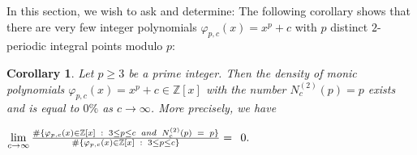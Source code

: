 \documentclass{article}
\theoremstyle{plain}
\newtheorem{cor}[thm]{Corollary}
\theoremstyle{definition}
\begin{document}
In this section, we wish to ask and determine:  The following corollary shows that there are very few integer polynomials $\varphi_{p,c}(x) = x^p + c$ with $p$ distinct $2$-periodic integral points modulo $p$:
\begin{cor}\label{5.1}
Let $p\geq 3$ be a prime integer. Then the density of monic polynomials $\varphi_{p,c}(x) = x^p + c\in \mathbb{Z}[x]$ with the number $N_{c}^{(2)}(p) = p$ exists and is equal to $0 \%$ as $c\to \infty$. More precisely, we have
\begin{center}
    $\lim\limits_{c\to\infty} \Large{\frac{\# \{\varphi_{p,c}(x) \in \mathbb{Z}[x]\ : \ 3\leq p\leq c \ and \ N_{c}^{(2)}(p) \ = \ p\}}{\Large{\# \{\varphi_{p,c}(x) \in \mathbb{Z}[x]\ : \ 3\leq p\leq c \}}}} = \ 0.$
\end{center}
\end{cor}
\end{document}
